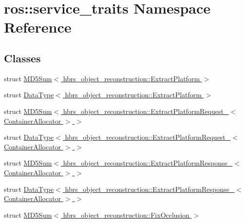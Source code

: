\hypertarget{namespaceros_1_1service__traits}{\section{ros\-:\-:service\-\_\-traits \-Namespace \-Reference}
\label{namespaceros_1_1service__traits}
}
\subsection*{\-Classes}
\begin{DoxyCompactItemize}
\item 
struct \hyperlink{structros_1_1service__traits_1_1_m_d5_sum_3_01hbrs__object__reconstruction_1_1_extract_platform_01_4}{\-M\-D5\-Sum$<$ hbrs\-\_\-object\-\_\-reconstruction\-::\-Extract\-Platform $>$}
\item 
struct \hyperlink{structros_1_1service__traits_1_1_data_type_3_01hbrs__object__reconstruction_1_1_extract_platform_01_4}{\-Data\-Type$<$ hbrs\-\_\-object\-\_\-reconstruction\-::\-Extract\-Platform $>$}
\item 
struct \hyperlink{structros_1_1service__traits_1_1_m_d5_sum_3_01hbrs__object__reconstruction_1_1_extract_platform_d974a0c713c2fedd447a3b4681f943de}{\-M\-D5\-Sum$<$ hbrs\-\_\-object\-\_\-reconstruction\-::\-Extract\-Platform\-Request\-\_\-$<$ Container\-Allocator $>$ $>$}
\item 
struct \hyperlink{structros_1_1service__traits_1_1_data_type_3_01hbrs__object__reconstruction_1_1_extract_platform3370078bee5a4b2391c6f2b9a1765e21}{\-Data\-Type$<$ hbrs\-\_\-object\-\_\-reconstruction\-::\-Extract\-Platform\-Request\-\_\-$<$ Container\-Allocator $>$ $>$}
\item 
struct \hyperlink{structros_1_1service__traits_1_1_m_d5_sum_3_01hbrs__object__reconstruction_1_1_extract_platform_1a5b4f3919bb91b97e6e9ba40c8cd7d1}{\-M\-D5\-Sum$<$ hbrs\-\_\-object\-\_\-reconstruction\-::\-Extract\-Platform\-Response\-\_\-$<$ Container\-Allocator $>$ $>$}
\item 
struct \hyperlink{structros_1_1service__traits_1_1_data_type_3_01hbrs__object__reconstruction_1_1_extract_platform96012c45555fcb89c9d012d6b196000a}{\-Data\-Type$<$ hbrs\-\_\-object\-\_\-reconstruction\-::\-Extract\-Platform\-Response\-\_\-$<$ Container\-Allocator $>$ $>$}
\item 
struct \hyperlink{structros_1_1service__traits_1_1_m_d5_sum_3_01hbrs__object__reconstruction_1_1_fix_occlusion_01_4}{\-M\-D5\-Sum$<$ hbrs\-\_\-object\-\_\-reconstruction\-::\-Fix\-Occlusion $>$}

\end{DoxyCompactItemize}
